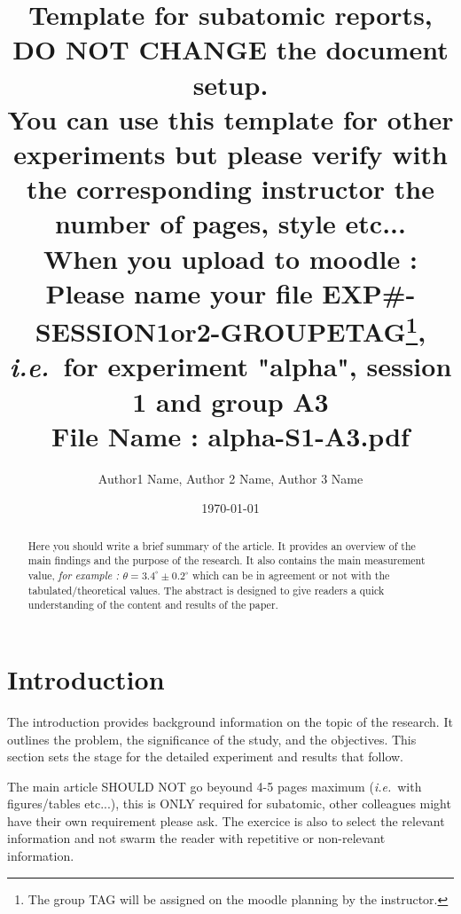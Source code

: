 \documentclass[a4paper, twocolumn]{article}
\newcommand{\ie}{\textit{i.e.}~}
\begin{document}

\title{\textbf{Template for subatomic reports},\\
\textbf{{\color{red} DO NOT CHANGE the document setup}}.\\
You can use this template for other experiments but please verify with the corresponding instructor the number of pages, style etc...\\
\textbf{When you upload to moodle} :\\Please name 
your file EXP\#-SESSION1or2-GROUPETAG\footnote{The group TAG will be assigned on the moodle planning by the instructor.},\\
\ie for experiment "alpha", session 1 and group A3\\ 
File Name : alpha-S1-A3.pdf\\}

\author{Author1 Name, Author 2 Name, Author 3 Name}

\date{\today}

\fontsize{8}{10}\selectfont  %

\maketitle

\begin{abstract}
Here you should write a brief summary of the article. It provides an overview of the main findings and the purpose of the research. It also contains the main measurement value, \textit{for example : $\theta=3.4^\circ \pm 0.2^\circ$} which can be in agreement or not with the tabulated/theoretical values. The abstract is designed to give readers a quick understanding of the content and results of the paper.
\end{abstract}

\section{Introduction}
\label{sec:introduction}
The introduction provides background information on the topic of the research. It outlines the problem, the significance of the study, and the objectives. This section sets the stage for the detailed experiment and results that follow.

{\color{red} The main article SHOULD NOT go beyound 4-5 pages maximum (\ie with figures/tables etc...), this is ONLY required for subatomic, other colleagues might have their own requirement please ask. The exercice is also to select the relevant information and not swarm the reader with repetitive or non-relevant information.}
\end{document}
